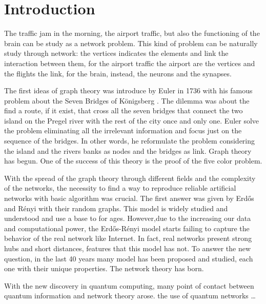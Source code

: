 \chapter*{Introduction}

The traffic jam in the morning, the airport traffic, but also the functioning of the brain can be study as a network problem. 
This kind of problem can be naturally study through network: the vertices indicates the elements and link the interaction between them, for the airport traffic the airport are the vertices and the flights the link, for the brain, instead, the neurons and the synapses. 



The first ideas of graph theory was introduce by Euler in 1736 with his famous problem about the Seven Bridges of Königsberg \cite{Euler}. The dilemma was about the find a route, if it exist, that cross all the seven bridges that connect the two island on the Pregel river with the rest of the city once and only one.  Euler solve the problem eliminating all the irrelevant information and focus just on the sequence of the bridges. In other words, he reformulate the problem considering the island and the rivers banks as nodes and the bridges as link.
Graph theory has begun. 
One of the success of this theory is the proof of the five color problem.

With the spread of the graph theory through different fields and the complexity of the networks, the necessity to find a way to reproduce reliable  artificial networks with basic algorithm was crucial. The first answer was given by Erd\H{o}s and Rényi \cite{erdos-renyi1960} with their random graphs. This model is widely studied and understood and use a base to for ages. 
However,due to the increasing our data and computational power, the Erd\H{o}s-Rényi model starts failing to capture the behavior of the real network like Internet. In fact, real networks present strong hubs and short distances, features that this model has not. 
To answer the new question, in the last 40 years many model has been proposed and studied, each one with their unique properties. The network theory has born. 

With the new discovery in quantum computing, many point of contact between quantum information and network theory arose. the use of quantum networks \dots


